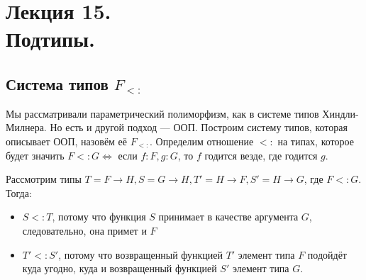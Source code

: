 \section{Лекция 15.\\ Подтипы.}

\subsection{Система типов \(F_{<:}\)}

Мы рассматривали параметрический полиморфизм, как в системе типов Хиндли-Милнера. Но есть и другой подход --- ООП. Построим систему типов, которая описывает ООП, назовём её \(F_{<:}\). Определим отношение \(<:\) на типах, которое будет значить \(F <: G \Leftrightarrow\) если \(f : F, g : G\), то \(f\) годится везде, где годится \(g\).

Рассмотрим типы \(T = F \to H, S = G \to H, T' = H \to F, S' = H \to G\), где \(F <: G\). Тогда:
\begin{itemize}
    \item \(S <: T\), потому что функция \(S\) принимает в качестве аргумента \(G\), следовательно, она примет и \(F\)
    \item \(T' <: S'\), потому что возвращенный функцией \(T'\) элемент типа \(F\) подойдёт куда угодно, куда и возвращенный функцией \(S'\) элемент типа \(G\).
\end{itemize}

\begin{figure}[h]
    \centering
\end{figure}

